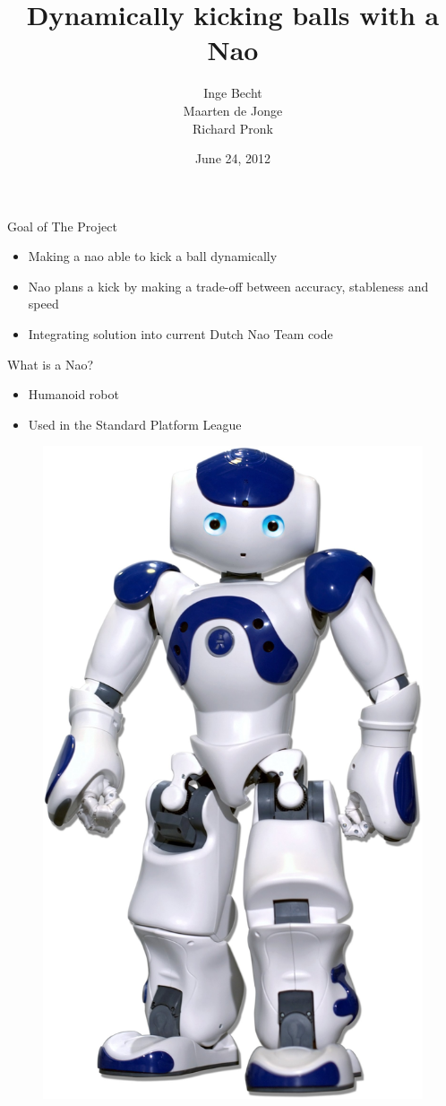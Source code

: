 \documentclass{beamer}
\title[Dynamically kicking balls]{Dynamically kicking balls with a
Nao}
\author{Inge Becht\\ Maarten de Jonge\\ Richard Pronk}
\institute{University of Amsterdam}
\date{June 24, 2012}
\begin{document}
\begin{frame}
\titlepage
\end{frame}

\begin{frame}{Goal of The Project}
    \begin{itemize}
        \item{Making a nao able to kick a ball dynamically}
        \item{Nao plans a kick by making a trade-off between
             accuracy, stableness and speed}
        \item{Integrating solution into current Dutch Nao Team code}
    \end{itemize}
\end{frame}

\begin{frame}{What is a Nao?}
    \begin{itemize}
        \item{Humanoid robot}
        \item{Used in the Standard Platform League}
    \end{itemize}
     \begin{figure}[H] 
        \begin{center}
            \includegraphics[scale=0.2]{nao.jpg}

\end{center}
\end{figure}
\end{frame}
\end{document}
